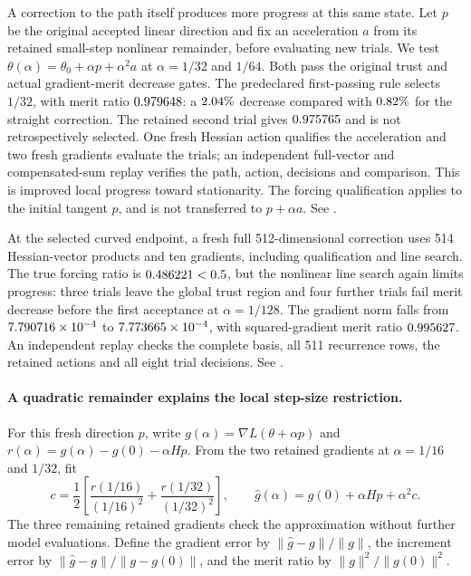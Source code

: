 \documentclass[11pt,letterpaper]{article}
\begin{document}
A correction to the path itself produces more progress at this same state.
Let $p$ be the original accepted linear direction and fix an acceleration $a$
from its retained small-step nonlinear remainder, before evaluating new trials.
We test $\theta(\alpha)=\theta_0+\alpha p+\alpha^2a$ at $\alpha=1/32$ and $1/64$.
Both pass the original trust and actual gradient-merit decrease gates.
The predeclared first-passing rule selects $1/32$, with merit ratio
$0.979648$: a $2.04\%$ decrease compared with
$0.82\%$ for the straight correction. The retained second
trial gives $0.975765$ and is not retrospectively selected.
One fresh Hessian action qualifies the acceleration and two fresh gradients
evaluate the trials; an independent full-vector and compensated-sum replay
verifies the path, action, decisions and comparison. This is improved local
progress toward stationarity. The forcing qualification applies to the initial
tangent $p$, and is not transferred to $p+\alpha a$.
See .

At the selected curved endpoint, a fresh full 512-dimensional correction
uses 514 Hessian-vector products and ten gradients, including qualification
and line search. The true
forcing ratio is $0.486221<0.5$, but the nonlinear line search again
limits progress: three trials leave the global trust region and four further
trials fail merit decrease before the first acceptance at $\alpha=1/128$.
The gradient norm falls from $7.790716\times10^{-4}$ to $7.773665\times10^{-4}$,
with squared-gradient merit ratio $0.995627$.
An independent replay checks the complete basis, all 511 recurrence rows,
the retained actions and all eight trial decisions.
See .

\paragraph{A quadratic remainder explains the local step-size restriction.}
For this fresh direction $p$, write $g(\alpha)=\nabla L(\theta+\alpha p)$
and $r(\alpha)=g(\alpha)-g(0)-\alpha H p$. From the two retained gradients at
$\alpha=1/16$ and $1/32$, fit
\[
 c=\frac12\left[\frac{r(1/16)}{(1/16)^2}
                 +\frac{r(1/32)}{(1/32)^2}\right],\qquad
 \widehat g(\alpha)=g(0)+\alpha Hp+\alpha^2c.
\]
The three remaining retained gradients check the approximation without
further model evaluations. Define the gradient error by
$\|\widehat g-g\|/\|g\|$, the increment error by
$\|\widehat g-g\|/\|g-g(0)\|$, and the merit ratio by
$\|g\|^2/\|g(0)\|^2$.
\end{document}
